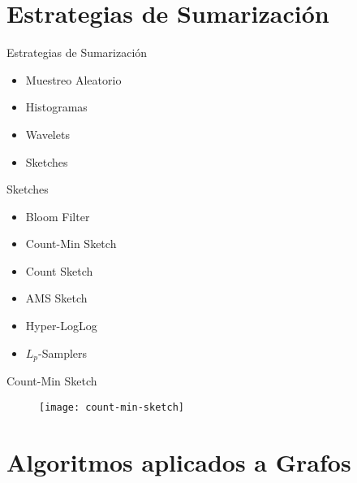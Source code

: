\documentclass[12pt]{beamer}
\begin{document}
  \section{Estrategias de Sumarización}

    \begin{frame}[fragile]{Estrategias de Sumarización}

      \begin{itemize}
        \item Muestreo Aleatorio
        \item Histogramas
        \item Wavelets
        \item Sketches
      \end{itemize}

    \end{frame}


    \begin{frame}[fragile]{Sketches}

      \begin{itemize}
        \item Bloom Filter \cite{bloom1970space}
        \item Count-Min Sketch \cite{cormode2005improved}
        \item Count Sketch \cite{charikar2002finding}
        \item AMS Sketch \cite{alon1996space}
        \item Hyper-LogLog \cite{flajolet2007hyperloglog}
        \item $L_p$-Samplers \cite{jowhari2011tight}
      \end{itemize}

    \end{frame}


    \begin{frame}[fragile]{Count-Min Sketch}

      \begin{figure}
        \texttt{[image: count-min-sketch]}
        \caption{}
        \label{}
      \end{figure}

    \end{frame}

  \section{Algoritmos aplicados a Grafos}
\end{document}

